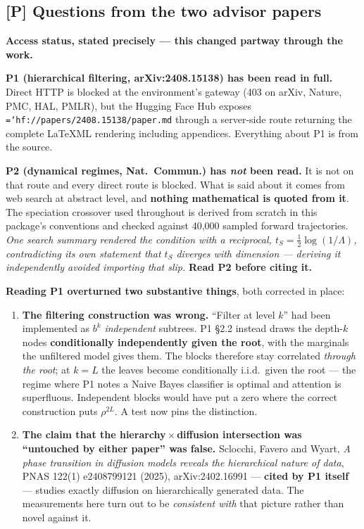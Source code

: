 \documentclass[11pt,a4paper]{article}
\newcommand{\code}[1]{\texttt{\small\hyphenchar\font=`\-\relax #1}}
\begin{document}
\subsection{[P] Questions from the two advisor papers}

\begin{keybox}
\textbf{Access status, stated precisely --- this changed partway through the work.}

\medskip
\textbf{P1 (hierarchical filtering, arXiv:2408.15138) has been read in full.} Direct HTTP is
blocked at the environment's gateway (403 on arXiv, Nature, PMC, HAL, PMLR), but the Hugging
Face Hub exposes \code{hf://papers/2408.15138/paper.md} through a server-side route
returning the complete LaTeXML rendering including appendices. Everything about P1 is from
the source.

\medskip
\textbf{P2 (dynamical regimes, Nat.\ Commun.) has \emph{not} been read.} It is not on that
route and every direct route is blocked. What is said about it comes from web search at
abstract level, and \textbf{nothing mathematical is quoted from it}. The speciation crossover
used throughout is derived from scratch in this package's conventions and checked against
40{,}000 sampled forward trajectories. \emph{One search summary rendered the condition with a
reciprocal, $t_S = \tfrac12\log(1/\Lambda)$, contradicting its own statement that $t_S$
diverges with dimension --- deriving it independently avoided importing that slip.}
\textbf{Read P2 before citing it.}
\end{keybox}

\noindent
\textbf{Reading P1 overturned two substantive things}, both corrected in place:

\begin{enumerate}
\item \textbf{The filtering construction was wrong.} ``Filter at level $k$'' had been
implemented as $b^k$ \emph{independent} subtrees. P1 §2.2 instead draws the depth-$k$ nodes
\textbf{conditionally independently given the root}, with the marginals the unfiltered model
gives them. The blocks therefore stay correlated \emph{through the root}; at $k=L$ the leaves
become conditionally i.i.d.\ given the root --- the regime where P1 notes a Naive Bayes
classifier is optimal and attention is superfluous. Independent blocks would have put a zero
where the correct construction puts $\rho^{2L}$. A test now pins the distinction.

\item \textbf{The claim that the hierarchy\,$\times$\,diffusion intersection was
``untouched by either paper'' was false.} Sclocchi, Favero and Wyart, \emph{A phase
transition in diffusion models reveals the hierarchical nature of data}, PNAS 122(1)
e2408799121 (2025), arXiv:2402.16991 --- \textbf{cited by P1 itself} --- studies exactly
diffusion on hierarchically generated data. The measurements here turn out to be
\emph{consistent with} that picture rather than novel against it.
\end{enumerate}
\end{document}
